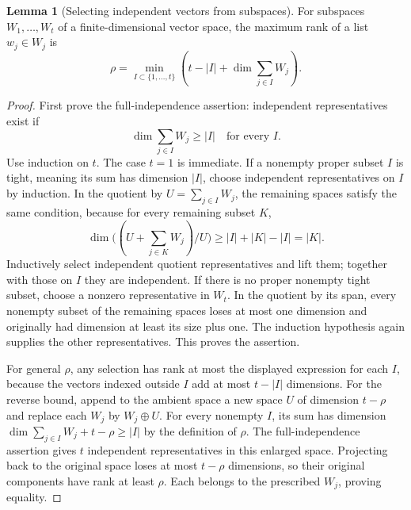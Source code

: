 \documentclass[11pt,a4paper]{article}
\theoremstyle{definition}
\newtheorem{lemma}[theorem]{Lemma}
\theoremstyle{definition}
\theoremstyle{remark}\newtheorem{remark}[theorem]{Remark}
\begin{document}
\begin{lemma}[Selecting independent vectors from subspaces]\label{lem:selection}
For subspaces $W_1,\ldots,W_t$ of a finite-dimensional vector space, the maximum rank of a list $w_j\in W_j$ is
\[
\rho=\min_{I\subset\{1,\ldots,t\}}\left(t-|I|+\dim\sum_{j\in I}W_j\right).
\]
\end{lemma}
\begin{proof}
First prove the full-independence assertion: independent representatives exist if
\[
\dim\sum_{j\in I}W_j\ge|I|\quad\text{for every }I.
\]
Use induction on $t$. The case $t=1$ is immediate. If a nonempty proper subset $I$ is tight, meaning its sum has dimension $|I|$, choose independent representatives on $I$ by induction. In the quotient by $U=\sum_{j\in I}W_j$, the remaining spaces satisfy the same condition, because for every remaining subset $K$,
\[
\dim\big((U+\sum_{j\in K}W_j)/U\big)
\ge |I|+|K|-|I|=|K|.
\]
Inductively select independent quotient representatives and lift them; together with those on $I$ they are independent. If there is no proper nonempty tight subset, choose a nonzero representative in $W_t$. In the quotient by its span, every nonempty subset of the remaining spaces loses at most one dimension and originally had dimension at least its size plus one. The induction hypothesis again supplies the other representatives. This proves the assertion.

For general $\rho$, any selection has rank at most the displayed expression for each $I$, because the vectors indexed outside $I$ add at most $t-|I|$ dimensions. For the reverse bound, append to the ambient space a new space $U$ of dimension $t-\rho$ and replace each $W_j$ by $W_j\oplus U$. For every nonempty $I$, its sum has dimension $\dim\sum_{j\in I}W_j+t-\rho\ge|I|$ by the definition of $\rho$. The full-independence assertion gives $t$ independent representatives in this enlarged space. Projecting back to the original space loses at most $t-\rho$ dimensions, so their original components have rank at least $\rho$. Each belongs to the prescribed $W_j$, proving equality.
\end{proof}
\end{document}
